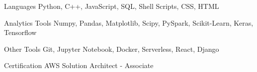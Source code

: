 


\begin{cvskills}


\cvskill
{Languages}
{Python, C++, JavaScript, SQL, Shell Scripts, CSS, HTML}


\cvskill
{Analytics Tools}
{Numpy, Pandas, Matplotlib, Scipy, PySpark, Scikit-Learn, Keras, Tensorflow}


\cvskill
{Other Tools}
{Git, Jupyter Notebook, Docker, Serverless, React, Django}


\cvskill
{Certification}
{AWS Solution Architect - Associate}


\end{cvskills}
